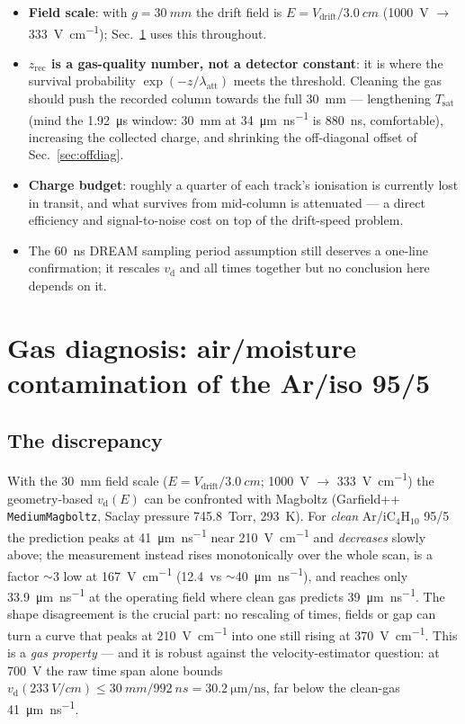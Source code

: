 \documentclass[11pt,a4paper]{article}
\newcommand{\vd}{v_{\mathrm{d}}}
\newcommand{\Tsat}{T_{\mathrm{sat}}}
\newcommand{\umns}{\micro\meter\per\nano\second}
\begin{document}
\begin{itemize}
  \item \textbf{Field scale}: with $g=\SI{30}{mm}$ the drift field is
        $E = V_{\mathrm{drift}}/\SI{3.0}{cm}$ (\SI{1000}{V} $\to$
        \SI{333}{\volt\per\centi\meter}); Sec.~\ref{sec:gas} uses this
        throughout.
  \item \textbf{$z_{\mathrm{rec}}$ is a gas-quality number, not a detector
        constant}: it is where the survival probability
        $\exp(-z/\lambda_{\mathrm{att}})$ meets the threshold.  Cleaning the
        gas should push the recorded column towards the full \SI{30}{mm} ---
        lengthening $\Tsat$ (mind the \SI{1.92}{\micro s} window:
        \SI{30}{mm} at \SI{34}{\umns} is \SI{880}{ns}, comfortable),
        increasing the collected charge, and shrinking the off-diagonal
        offset of Sec.~\ref{sec:offdiag}.
  \item \textbf{Charge budget}: roughly a quarter of each track's ionisation
        is currently lost in transit, and what survives from mid-column is
        attenuated --- a direct efficiency and signal-to-noise cost on top of
        the drift-speed problem.
  \item The \SI{60}{ns} DREAM sampling period assumption still deserves a
        one-line confirmation; it rescales $\vd$ and all times together but
        no conclusion here depends on it.
\end{itemize}

\section{Gas diagnosis: air/moisture contamination of the Ar/iso 95/5}
\label{sec:gas}

\subsection{The discrepancy}

With the \SI{30}{mm} field scale
($E = V_{\mathrm{drift}}/\SI{3.0}{cm}$; \SI{1000}{V} $\to$
\SI{333}{\volt\per\centi\meter}) the geometry-based $\vd(E)$ can be
confronted with Magboltz (Garfield++ \texttt{MediumMagboltz}, Saclay
pressure \SI{745.8}{Torr}, \SI{293}{K}).  For \emph{clean}
Ar/iC$_4$H$_{10}$ 95/5 the prediction peaks at \SI{41}{\umns} near
\SI{210}{\volt\per\centi\meter} and \emph{decreases} slowly above; the
measurement instead rises monotonically over the whole scan, is a factor
$\sim$3 low at \SI{167}{\volt\per\centi\meter} (\SI{12.4} vs
$\sim$\SI{40}{\umns}), and reaches only \SI{33.9}{\umns} at the operating
field where clean gas predicts \SI{39}{\umns}.  The shape disagreement is
the crucial part: no rescaling of times, fields or gap can turn a curve
that peaks at \SI{210}{\volt\per\centi\meter} into one still rising at
\SI{370}{\volt\per\centi\meter}.  This is a \emph{gas property} --- and it
is robust against the velocity-estimator question: at \SI{700}{V} the raw
time span alone bounds $\vd(\SI{233}{V/cm}) \leq \SI{30}{mm}/\SI{992}{ns}
= \SI{30.2}{\umns}$, far below the clean-gas \SI{41}{\umns}.
\end{document}
